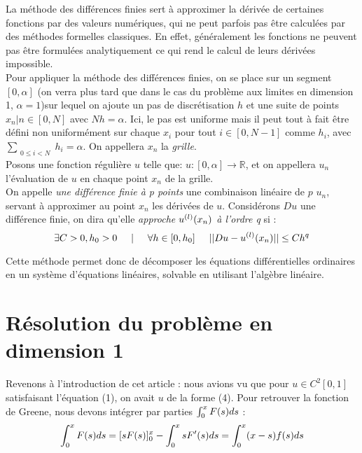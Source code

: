 \documentclass[11pt]{article}
\newcommand{\R}{\mathbb R}
\begin{document}
\quad La méthode des différences finies sert à approximer la dérivée de certaines fonctions par des valeurs numériques, qui ne peut parfois pas être calculées par des méthodes formelles classiques. En effet, généralement les fonctions ne peuvent pas être formulées analytiquement ce qui rend le calcul de leurs dérivées impossible.
\\
\quad Pour appliquer la méthode des différences finies, on se place sur un segment $[0, \alpha]$ (on verra plus tard que dans le cas du problème aux limites en dimension 1, $\alpha = 1$)sur lequel on ajoute un pas de discrétisation $h$ et une suite de points $x_n | n\in [0, N]$ avec $Nh = \alpha$. Ici, le pas est uniforme mais il peut tout à fait être défini non uniformément sur chaque $x_i$ pour tout $i \in [0, N-1]$ comme $h_i$, avec $\sum_{\substack{0 \le i< N}}h_i = \alpha$. On appellera $x_n$ la \emph{grille}.
\\
\quad Posons une fonction régulière $u$ telle que: $u : [0, \alpha] \longrightarrow \R$, et on appellera $u_n$ l'évaluation de $u$ en chaque point $x_n$ de la grille. \\
On appelle \emph{une différence finie à p points} une combinaison linéaire de $p$ $u_n$, servant à approximer au point $x_n$ les dérivées de $u$. Considérons $Du$ une différence finie, on dira qu'elle \emph{approche $u^{(l)}\relax(x_n)$ à l'ordre q} si :
\begin{equation}
\exists C>0, h_0 >0 \hspace{5mm}|\hspace{5mm} \forall h \in [0, h_0] \hspace{5mm} ||Du - u^{(l)}\relax(x_n)|| \le Ch^q
\end{equation}




\quad Cette méthode permet donc de décomposer les équations différentielles ordinaires en un système d'équations linéaires, solvable en utilisant l'algèbre linéaire.


\section{Résolution du problème en dimension 1}

\quad Revenons à l'introduction de cet article : nous avions vu que pour $u \in C^2 [0, 1]$ satisfaisant l'équation (1), on avait $u$ de la forme (4).  Pour retrouver la fonction de Greene, nous devons intégrer par parties $\int_0^x F\relax(s) ds$ : 
\begin{equation}
\int_0^x F\relax(s) ds = [sF\relax(s)]_0^x - \int_0^x sF'\relax(s) ds = \int_0^x(x-s)f\relax(s)ds
\end{equation}
\end{document}
